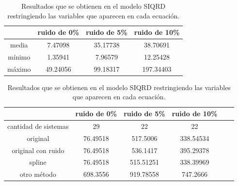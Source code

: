 \begin{table}[!h]
    \centering
    \caption{Resultados que se obtienen en el modelo SIQRD restringiendo las variables que aparecen en cada ecuación.}
    \begin{tabular}{|c|c|c|c|}
        \hline
               & \textbf{ruido de 0\%} & \textbf{ruido de 5\%} & \textbf{ruido de 10\%} \\
        \hline
        media  & 7.47098               & 35.17738              & 38.70691               \\
        \hline
        mínimo & 1.35941               & 7.96579               & 12.25428               \\
        \hline
        máximo & 49.24056              & 99.18317              & 197.34403              \\
        \hline
    \end{tabular}

    \begin{tabular}{|c|c|c|c|c|c|}
        \hline
                             & \textbf{ruido de 0\%} & \textbf{ruido de 5\%} & \textbf{ruido de 10\%} \\
        \hline
        cantidad de sistemas & 29                    & 22                    & 22                     \\
        \hline
        original             & 76.49518              & 517.5006              & 338.54534              \\
        \hline
        original con ruido   & 76.49518              & 536.1417              & 395.29378              \\
        \hline
        spline               & 76.49518              & 515.51251             & 338.39969              \\
        \hline
        otro método          & 698.3556              & 919.78558             & 747.2666               \\
        \hline
    \end{tabular}
    \label{table:experiment_SIQRD}
\end{table}


